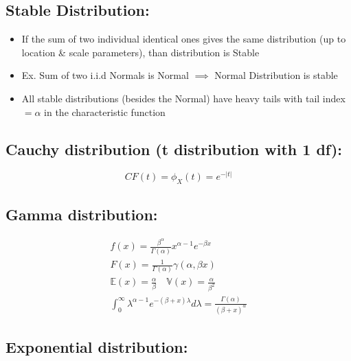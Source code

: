 \documentclass[
  oneside]{book}
\providecommand{\tightlist}{%
  \setlength{\itemsep}{0pt}\setlength{\parskip}{0pt}}
\begin{document}
\hypertarget{stable-distribution}{%
\subsection{Stable Distribution:}\label{stable-distribution}}

\begin{itemize}
\tightlist
\item
  If the sum of two individual identical ones gives the same distribution (up to location \& scale parameters), than distribution is Stable
\item
  Ex. Sum of two i.i.d Normals is Normal \(\implies\) Normal Distribution is stable
\item
  All stable distributions (besides the Normal) have heavy tails with tail index \(=\alpha\) in the characteristic function
\end{itemize}

\hypertarget{cauchy-distribution-t-distribution-with-1-df}{%
\subsection{Cauchy distribution (t distribution with 1 df):}\label{cauchy-distribution-t-distribution-with-1-df}}

\[
CF(t) = \phi_{X}(t) = e^{-|t|}
\]

\hypertarget{gamma-distribution}{%
\subsection{Gamma distribution:}\label{gamma-distribution}}

\[
\begin{gathered}
{\displaystyle f(x)={\frac {\beta ^{\alpha }}{\Gamma (\alpha )}}x^{\alpha -1}e^{-\beta x}}\\
{\displaystyle F(x)={\frac {1}{\Gamma (\alpha )}}\gamma (\alpha ,\beta x)}\\
\mathbb{E}(x) = {\frac  {\alpha }{\beta }} \quad \mathbb{V}(x) = {\displaystyle {\frac {\alpha }{\beta ^{2}}}}\\
\int_0^{\infty} \lambda^{\alpha-1} e^{-(\beta+x) \lambda} d \lambda = \frac{\Gamma(\alpha)}{(\beta+x)^\alpha}
\end{gathered}
\]

\hypertarget{exponential-distribution}{%
\subsection{Exponential distribution:}\label{exponential-distribution}}
\end{document}

